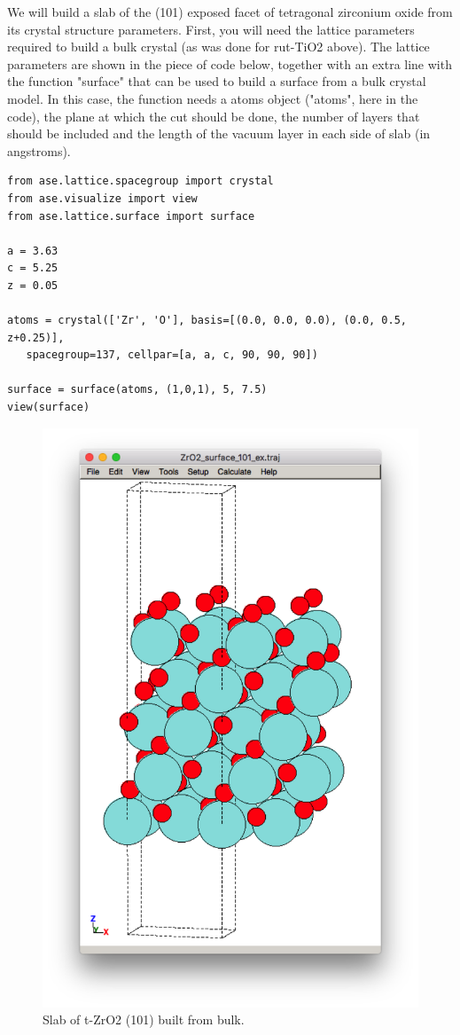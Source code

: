 \documentclass[11pt]{article}
\begin{document}
We will build a slab of the (101) exposed facet of tetragonal zirconium oxide from its crystal structure parameters. First, you will need the lattice parameters required to build a bulk crystal (as was done for rut-TiO2 above). The lattice parameters are shown in the piece of code below, together with an extra line with the function "surface" that can be used to build a surface from a bulk crystal model. In this case, the function needs a atoms object ("atoms", here in the code), the plane at which the cut should be done, the number of layers that should be included and the length of the vacuum layer in each side of slab (in angstroms). 

\begin{verbatim}
from ase.lattice.spacegroup import crystal
from ase.visualize import view
from ase.lattice.surface import surface

a = 3.63
c = 5.25
z = 0.05

atoms = crystal(['Zr', 'O'], basis=[(0.0, 0.0, 0.0), (0.0, 0.5, z+0.25)],
   spacegroup=137, cellpar=[a, a, c, 90, 90, 90])

surface = surface(atoms, (1,0,1), 5, 7.5)
view(surface)
\end{verbatim}

\begin{figure}[htb]
\centering
\includegraphics[width=.9\linewidth]{./figures/ZrO2_surf_ex.png}
\caption{Slab of t-ZrO2 (101) built from bulk.}
\end{figure}
\end{document}
